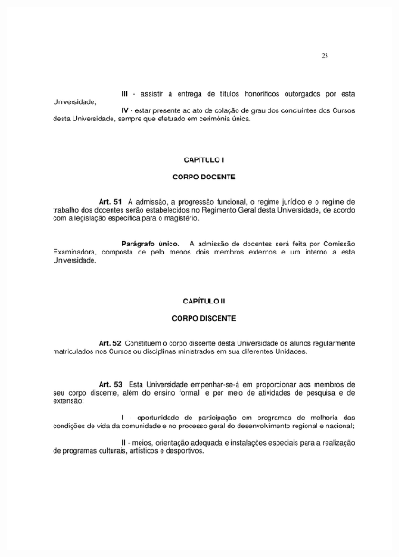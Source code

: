 \begin{figure}[p]
	\centering 
	\includegraphics[scale=0.7]{capitulos/resolucoes/cuni414/cuni414-23.pdf}
\end{figure} \pagebreak


